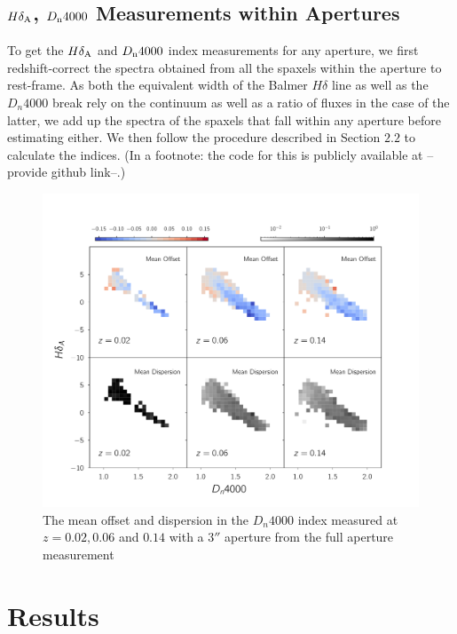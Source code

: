 \subsection{$H\delta_{\rm A}$, $D_{\rm n}4000$ Measurements within Apertures}
To get the $H\delta_{\rm A}$ and $D_{\rm n}4000$ index measurements for any aperture, we first redshift-correct the spectra obtained from all the spaxels within the aperture to rest-frame. As both the equivalent width of the Balmer $H\delta$ line as well as the $D_{n}4000$ break rely on the continuum as well as a ratio of fluxes in the case of the latter, we add up the spectra of the spaxels that fall within any aperture before estimating either. We then follow the procedure described in Section $2.2$ to calculate the indices. (In a footnote: the code for this is publicly available at --provide github link--.)


\begin{figure}
\includegraphics[width=\textwidth]{figures/dn4000_full_aperture_comparisons.pdf}
\caption[Short figure name.]{ The mean offset and dispersion in the $D_{n}4000$ index measured at $z = 0.02,0.06$ and $0.14$ with a $3''$ aperture from the full aperture measurement
\label{fig:myInlineFigure}}
\end{figure}



\section{Results}


